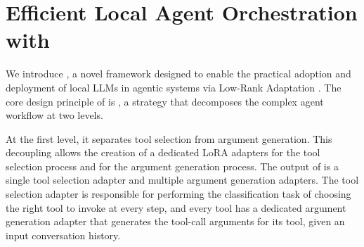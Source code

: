 


\section{Efficient Local Agent Orchestration with \sys{}}

We introduce \sys{}, a novel framework designed to enable the practical adoption and deployment of local LLMs in agentic systems via Low-Rank Adaptation \cite{hu2022lora}. The core design principle of \sys{} is \textbf{\decoupled}, a strategy that decomposes the complex agent workflow at two levels. 

At the first level, it separates tool selection from argument generation. This decoupling allows the creation of a dedicated LoRA adapters for the tool selection process and for the argument generation process. The output of \decoupled{} is a single tool selection adapter and multiple argument generation adapters. The tool selection adapter is responsible for performing the classification task of choosing the right tool to invoke at every step, and every tool has a dedicated argument generation adapter that generates the tool-call arguments for its tool, given an input conversation history. 

